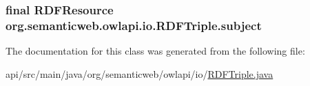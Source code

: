 \hypertarget{classorg_1_1semanticweb_1_1owlapi_1_1io_1_1_r_d_f_triple_adc6a953293f76094fcc24c18cc4ffec3}{
\subsubsection[{subject}]{\setlength{\rightskip}{0pt plus 5cm}final {\bf R\-D\-F\-Resource} org.\-semanticweb.\-owlapi.\-io.\-R\-D\-F\-Triple.\-subject\hspace{0.3cm}{\ttfamily [private]}}}\label{classorg_1_1semanticweb_1_1owlapi_1_1io_1_1_r_d_f_triple_adc6a953293f76094fcc24c18cc4ffec3}


The documentation for this class was generated from the following file\-:\begin{DoxyCompactItemize}
\item 
api/src/main/java/org/semanticweb/owlapi/io/\hyperlink{api_2src_2main_2java_2org_2semanticweb_2owlapi_2io_2_r_d_f_triple_8java}{R\-D\-F\-Triple.\-java}\end{DoxyCompactItemize}
